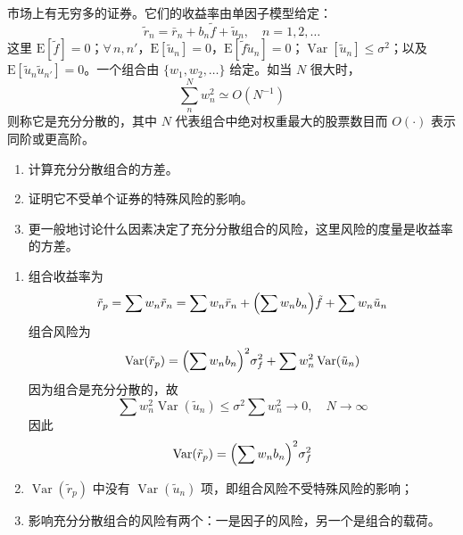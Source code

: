 
\begin{problem}
 市场上有无穷多的证券。它们的收益率由单因子模型给定：
\[
    \tilde{r}_{n}=\bar{r}_{n}+b_{n}\tilde{f}+\tilde{u}_{n},\quad n=1,2,\ldots
\]
这里 $\mathrm{E}[\tilde{f}]=0$；$\forall\,n,n'$，$\mathrm{E}[\tilde{u}_{n}]=0$，$\mathrm{E}[\tilde{f}\tilde{u}_{n}]=0$；$\operatorname{Var}[\tilde{u}_{n}]\le\sigma^{2}$；以及 $\mathrm{E}[\tilde{u}_{n}\tilde{u}_{n'}]=0$。一个组合由 $\{w_{1},w_{2},\ldots\}$ 给定。如当 $N$ 很大时，
\[
    \sum_{n}^{N}w_{n}^{2}\simeq O(N^{-1})
\]
则称它是充分分散的，其中 $N$ 代表组合中绝对权重最大的股票数目而 $O(\cdot)$ 表示同阶或更高阶。
\begin{enumerate}[label=(\alph*)]
    \item 计算充分分散组合的方差。
    \item 证明它不受单个证券的特殊风险的影响。
    \item 更一般地讨论什么因素决定了充分分散组合的风险，这里风险的度量是收益率的方差。
\end{enumerate}
\end{problem}
\begin{solution}
\begin{enumerate}[label=(\alph*)]
    \item 组合收益率为
    \[
        \tilde{r}_{p}=\sum w_{n}\tilde{r}_{n}=\sum w_{n}\bar{r}_{n}+\Bigl(\sum w_{n}b_{n}\Bigr)\tilde{f}+\sum w_{n}\tilde{u}_{n}
    \]
    组合风险为
    \[
        \operatorname{Var}(\tilde{r}_{p})=\Bigl(\sum w_{n}b_{n}\Bigr)^{2}\sigma_{f}^{2}+\sum w_{n}^{2}\operatorname{Var}(\tilde{u}_{n})
    \]
    因为组合是充分分散的，故
    \[
        \sum w_{n}^{2}\operatorname{Var}(\tilde{u}_{n})\le\sigma^{2}\sum w_{n}^{2}\to 0,\quad N\to\infty
    \]
    因此
    \[
        \operatorname{Var}(\tilde{r}_{p})=\Bigl(\sum w_{n}b_{n}\Bigr)^{2}\sigma_{f}^{2}
    \]
    \item $\operatorname{Var}(\tilde{r}_{p})$ 中没有 $\operatorname{Var}(\tilde{u}_{n})$ 项，即组合风险不受特殊风险的影响；
    \item 影响充分分散组合的风险有两个：一是因子的风险，另一个是组合的载荷。
\end{enumerate}
\end{solution}

